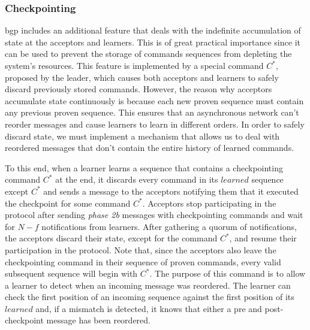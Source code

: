 \subsubsection{Checkpointing}  \acrshort{bgp} includes an additional feature that deals with the indefinite accumulation of state at the acceptors and learners. This is of great practical importance since it can be used to prevent the storage of commands sequences from depleting the system's resources. This feature is implemented by a special command $C^*$, proposed by the leader, which causes both acceptors and learners to safely discard previously stored commands. However, the reason why acceptors accumulate state continuously is because each new proven sequence must contain any previous proven sequence. This ensures that an asynchronous network can't reorder messages and cause learners to learn in different orders. In order to safely discard state, we must implement a mechanism that allows us to deal with reordered messages that don't contain the entire history of learned commands.\par
To this end, when a learner learns a sequence that contains a checkpointing command $C^*$ at the end, it discards every command in its $learned$ sequence except $C^*$ and sends a message to the acceptors notifying them that it executed the checkpoint for some command $C^*$. Acceptors stop participating in the protocol after sending \textit{phase 2b} messages with checkpointing commands and wait for $N-f$ notifications from learners. After gathering a quorum of notifications, the acceptors discard their state, except for the command $C^*$, and resume their participation in the protocol. Note that, since the acceptors also leave the checkpointing command in their sequence of proven commands, every valid subsequent sequence will begin with $C^*$. The purpose of this command is to allow a learner to detect when an incoming message was reordered. The learner can check the first position of an incoming sequence against the first position of its $learned$ and, if a mismatch is detected, it knows that either a pre and post-checkpoint message has been reordered. 
\par
